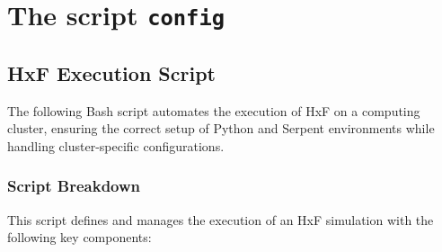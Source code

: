 \documentclass{article}
\begin{document}
\newpage
\section{The script \texttt{config}}\label{sec:config}

\subsection{HxF Execution Script}
The following Bash script automates the execution of HxF on a computing cluster, ensuring the correct setup of Python and Serpent environments while handling cluster-specific configurations.

\subsubsection{Script Breakdown}
This script defines and manages the execution of an HxF simulation with the following key components:
\end{document}
